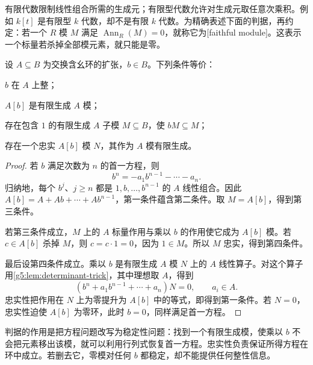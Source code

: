 有限代数限制线性组合所需的生成元；有限型代数允许对生成元取任意次乘积。例如 \(k[t]\) 是有限型 \(k\) 代数，却不是有限 \(k\) 代数。为精确表述下面的判据，再约定：若一个 \(R\) 模 \(M\) 满足 \(\operatorname{Ann}_R(M)=0\)，就称它为[faithful module]。这表示一个标量若杀掉全部模元素，就只能是零。

\begin{proposition}
\label{g5:prop:integral-finite-criterion}
	设 \(A\subseteq B\) 为交换含幺环的扩张，\(b\in B\)。下列条件等价：
	\begin{equivalences}
		\item \(b\) 在 \(A\) 上整；
		\item \(A[b]\) 是有限生成 \(A\) 模；
		\item 存在包含 \(1\) 的有限生成 \(A\) 子模 \(M\subseteq B\)，使 \(bM\subseteq M\)；
		\item 存在一个忠实 \(A[b]\) 模 \(N\)，其作为 \(A\) 模有限生成。
	\end{equivalences}
\end{proposition}
\begin{proof}
	若 \(b\) 满足次数为 \(n\) 的首一方程，则
	\[
		b^n=-a_1b^{n-1}-\cdots-a_n.
	\]
	归纳地，每个 \(b^j\)、\(j\geq n\) 都是 \(1,b,\ldots,b^{n-1}\) 的 \(A\) 线性组合。因此 \(A[b]=A+Ab+\cdots+Ab^{n-1}\)，第一条件蕴含第二条件。取 \(M=A[b]\)，得到第三条件。

	若第三条件成立，\(M\) 上的 \(A\) 标量作用与乘以 \(b\) 的作用使它成为 \(A[b]\) 模。若 \(c\in A[b]\) 杀掉 \(M\)，则 \(c=c\cdot1=0\)，因为 \(1\in M\)。所以 \(M\) 忠实，得到第四条件。

	最后设第四条件成立。乘以 \(b\) 是有限生成 \(A\) 模 \(N\) 上的 \(A\) 线性算子。对这个算子用\cref{g5:lem:determinant-trick}，其中理想取 \(A\)，得到
	\[
		(b^n+a_1b^{n-1}+\cdots+a_n)N=0,
		\qquad a_i\in A.
	\]
	忠实性把作用在 \(N\) 上为零提升为 \(A[b]\) 中的等式，即得到第一条件。若 \(N=0\)，忠实性迫使 \(A[b]\) 为零环，此时 \(b=0\)，同样满足首一方程。
\end{proof}

判据的作用是把方程问题改写为稳定性问题：找到一个有限生成模，使乘以 \(b\) 不会把元素移出该模，就可以利用行列式恢复首一方程。忠实性负责保证所得方程在环中成立。若删去它，零模对任何 \(b\) 都稳定，却不能提供任何整性信息。

